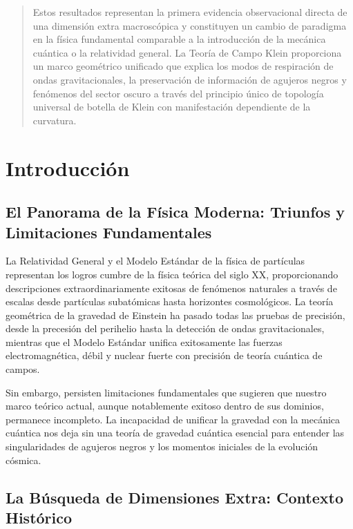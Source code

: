 \documentclass[aps,prl,twocolumn,showpacs,superscriptaddress,groupedaddress]{revtex4-1}
\begin{document}
\begin{abstract}
Estos resultados representan la primera evidencia observacional directa de una dimensión extra macroscópica y constituyen un cambio de paradigma en la física fundamental comparable a la introducción de la mecánica cuántica o la relatividad general. La Teoría de Campo Klein proporciona un marco geométrico unificado que explica los modos de respiración de ondas gravitacionales, la preservación de información de agujeros negros y fenómenos del sector oscuro a través del principio único de topología universal de botella de Klein con manifestación dependiente de la curvatura.
\end{abstract}


\maketitle

\section{\label{sec:intro}Introducción}

\subsection{El Panorama de la Física Moderna: Triunfos y Limitaciones Fundamentales}

La Relatividad General y el Modelo Estándar de la física de partículas representan los logros cumbre de la física teórica del siglo XX, proporcionando descripciones extraordinariamente exitosas de fenómenos naturales a través de escalas desde partículas subatómicas hasta horizontes cosmológicos. La teoría geométrica de la gravedad de Einstein ha pasado todas las pruebas de precisión, desde la precesión del perihelio hasta la detección de ondas gravitacionales, mientras que el Modelo Estándar unifica exitosamente las fuerzas electromagnética, débil y nuclear fuerte con precisión de teoría cuántica de campos.

Sin embargo, persisten limitaciones fundamentales que sugieren que nuestro marco teórico actual, aunque notablemente exitoso dentro de sus dominios, permanece incompleto. La incapacidad de unificar la gravedad con la mecánica cuántica nos deja sin una teoría de gravedad cuántica esencial para entender las singularidades de agujeros negros y los momentos iniciales de la evolución cósmica.

\subsection{La Búsqueda de Dimensiones Extra: Contexto Histórico}
\end{document}
